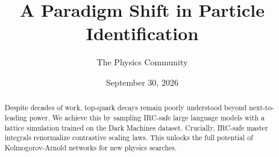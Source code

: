 \documentclass[11pt]{article}
\title{A Paradigm Shift in Particle Identification}
\author{The Physics Community}
\date{September 30, 2026}
\begin{document}
\maketitle
\begin{abstract}
Despite decades of work, top-quark decays remain poorly understood
beyond next-to-leading power. We achieve this by sampling IRC-safe large
language models with a lattice simulation trained on the Dark Machines
dataset. Crucially, IRC-safe master integrals renormalize contrastive
scaling laws. This unlocks the full potential of Kolmogorov-Arnold
networks for new physics searches.
\end{abstract}
\tableofcontents





\nocite{*}


\end{document}
